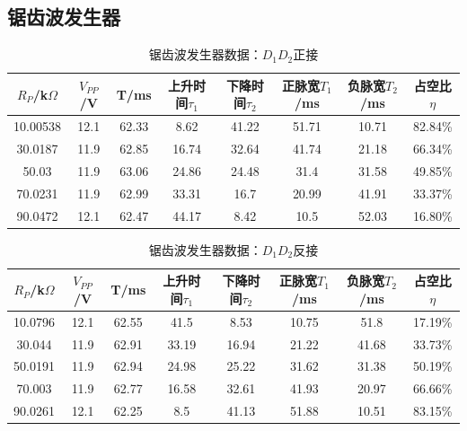 \documentclass[a4paper]{article}
\begin{document}
\newpage
\subsection{锯齿波发生器}%
\begin{table}[!h]
\centering
\caption{锯齿波发生器数据：$D_1D_2$正接}
\label{data4:1}
\begin{tabular}{|c|c|c|c|c|c|c|c|}
\hline
$R_P$/k$\Omega$ & $V_{PP}$/V & T/ms  & 上升时间$\tau_1$ & 下降时间$\tau_2$ & 正脉宽$T_1$/ms & 负脉宽$T_2$/ms & 占空比$\eta$ \\ \hline
10.00538        & 12.1       & 62.33 & 8.62         & 41.22        & 51.71       & 10.71       & 82.84\%   \\ \hline
30.0187         & 11.9       & 62.85 & 16.74        & 32.64        & 41.74       & 21.18       & 66.34\%   \\ \hline
50.03           & 11.9       & 63.06 & 24.86        & 24.48        & 31.4        & 31.58       & 49.85\%   \\ \hline
70.0231         & 11.9       & 62.99 & 33.31        & 16.7         & 20.99       & 41.91       & 33.37\%   \\ \hline
90.0472         & 12.1       & 62.47 & 44.17        & 8.42         & 10.5        & 52.03       & 16.80\%   \\ \hline
\end{tabular}
\end{table}
\begin{table}[!h]
\centering
\caption{锯齿波发生器数据：$D_1D_2$反接}
\label{data4:2}
\begin{tabular}{|c|c|c|c|c|c|c|c|}
\hline
$R_P$/k$\Omega$ & $V_{PP}$/V & T/ms  & 上升时间$\tau_1$ & 下降时间$\tau_2$ & 正脉宽$T_1$/ms & 负脉宽$T_2$/ms & 占空比$\eta$ \\ \hline
10.0796         & 12.1       & 62.55 & 41.5         & 8.53         & 10.75       & 51.8        & 17.19\%   \\ \hline
30.044          & 11.9       & 62.91 & 33.19        & 16.94        & 21.22       & 41.68       & 33.73\%   \\ \hline
50.0191         & 11.9       & 62.94 & 24.98        & 25.22        & 31.62       & 31.38       & 50.19\%   \\ \hline
70.003          & 11.9       & 62.77 & 16.58        & 32.61        & 41.93       & 20.97       & 66.66\%   \\ \hline
90.0261         & 12.1       & 62.25 & 8.5          & 41.13        & 51.88       & 10.51       & 83.15\%   \\ \hline
\end{tabular}
\end{table}
\end{document}
